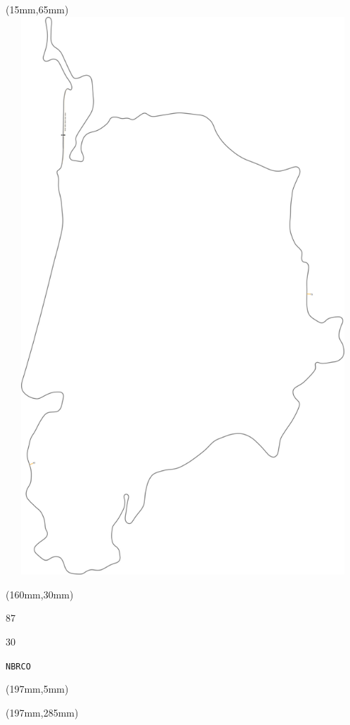 \begin{textblock*}{185mm}(15mm,65mm)%
\centering
\mbox{\includegraphics[width=185mm,height=210mm,keepaspectratio]{PT/NBRCO.pdf}}
\end{textblock*}
\begin{textblock*}{40mm}(160mm,30mm)%
\Large
\par{} 
\par87 
\par30 
\par\hfill\tiny\tt NBRCO\\
\end{textblock*}
\begin{textblock*}{20mm}(197mm,5mm)%
\fbox{\thepage}
\label{NBRCO}
\end{textblock*}
\begin{textblock*}{20mm}(197mm,285mm)%
\fbox{\thepage}
\end{textblock*}

